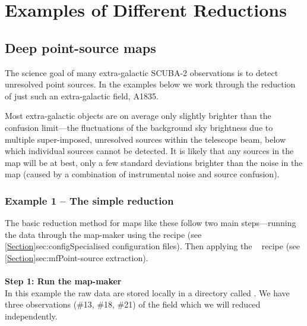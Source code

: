 \documentclass[11pt,oneside,chapters]{starlink}
\begin{document}
\chapter{Examples of Different Reductions}
\label{sec:eg}

\section{Deep point-source maps}
\label{sec:cosmology}

The science goal of many extra-galactic SCUBA-2 observations is to
detect unresolved point sources. In the examples below we work through the
reduction of just such an extra-galactic field, A1835.

Most extra-galactic objects are on average only slightly brighter than
the confusion limit---the fluctuations of the background sky
brightness due to multiple super-imposed, unresolved sources within
the telescope beam, below which individual sources cannot be detected.
It is likely that any sources in the map will be at best, only a few
standard deviations brighter than the noise in the map (caused by a
combination of instrumental noise and source confusion).

\subsection{Example 1 -- The simple reduction}
The basic reduction method for maps like these follow two main
steps---running the data through the map-maker using the
 recipe (see
\cref{Section}{sec:config}{Specialised configuration files}). Then
applying the \picard\  recipe (see
\cref{Section}{sec:mf}{Point-source extraction}).
\\ \\
\textbf{Step 1: Run the map-maker}\\
In this example the raw data are stored locally in a directory called
. We have three observations (\#13, \#18, \#21) of the field
which we will reduced independently.

\end{document}
